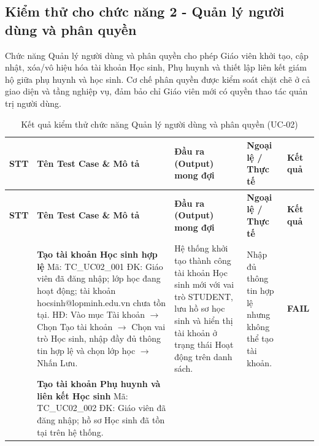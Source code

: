 \vspace{0.8em}
\subsection{Kiểm thử cho chức năng 2 - Quản lý người dùng và phân quyền}

\hspace*{1em}Chức năng Quản lý người dùng và phân quyền cho phép Giáo viên khởi tạo, cập nhật, xóa/vô hiệu hóa tài khoản Học sinh, Phụ huynh và thiết lập liên kết giám hộ giữa phụ huynh và học sinh. Cơ chế phân quyền được kiểm soát chặt chẽ ở cả giao diện và tầng nghiệp vụ, đảm bảo chỉ Giáo viên mới có quyền thao tác quản trị người dùng.

\vspace{0.4em}
\begin{longtable}{|>{\centering\arraybackslash}p{0.8cm}|>{\raggedright\arraybackslash}p{4.6cm}|>{\raggedright\arraybackslash}p{3.8cm}|>{\raggedright\arraybackslash}p{3.8cm}|>{\centering\arraybackslash}p{1.5cm}|}
\caption{Kết quả kiểm thử chức năng Quản lý người dùng và phân quyền (UC-02)}\label{tab:test-uc02}\\
\hline
\textbf{STT} & \textbf{Tên Test Case \& Mô tả} & \textbf{Đầu ra (Output) mong đợi} & \textbf{Ngoại lệ / Thực tế} & \textbf{Kết quả} \\
\hline
\endfirsthead
\hline
\textbf{STT} & \textbf{Tên Test Case \& Mô tả} & \textbf{Đầu ra (Output) mong đợi} & \textbf{Ngoại lệ / Thực tế} & \textbf{Kết quả} \\
\hline
\endhead
1 & \textbf{Tạo tài khoản Học sinh hợp lệ}\newline
Mã: TC\_UC02\_001\newline
ĐK: Giáo viên đã đăng nhập; lớp học đang hoạt động; tài khoản hocsinh@lopminh.edu.vn chưa tồn tại.\newline
HĐ: Vào mục Tài khoản $\rightarrow$ Chọn Tạo tài khoản $\rightarrow$ Chọn vai trò Học sinh, nhập đầy đủ thông tin hợp lệ và chọn lớp học $\rightarrow$ Nhấn Lưu. &
Hệ thống khởi tạo thành công tài khoản Học sinh mới với vai trò STUDENT, lưu hồ sơ học sinh và hiển thị tài khoản ở trạng thái Hoạt động trên danh sách. &
Nhập đủ thông tin hợp lệ nhưng không thể tạo tài khoản. & \textbf{FAIL} \\
\hline
2 & \textbf{Tạo tài khoản Phụ huynh và liên kết Học sinh}\newline
Mã: TC\_UC02\_002\newline
ĐK: Giáo viên đã đăng nhập; hồ sơ Học sinh đã tồn tại trên hệ thống.\newline

\end{longtable}
